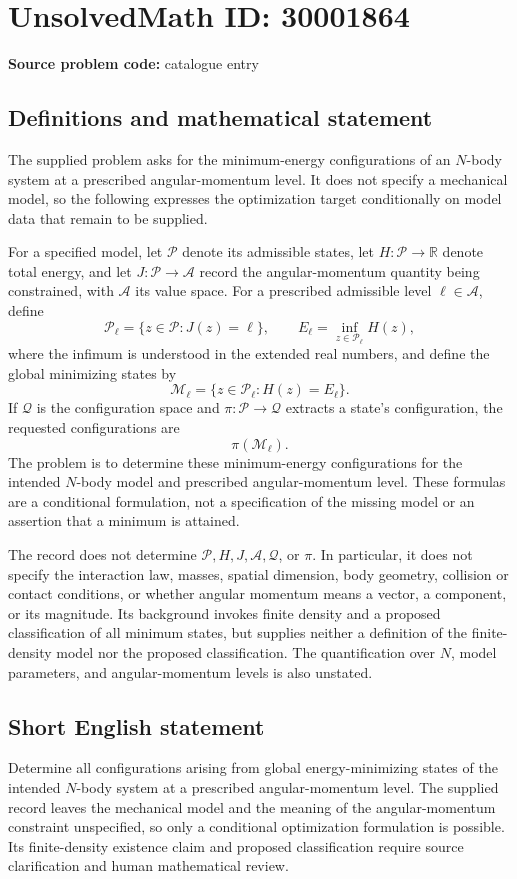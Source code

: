 \documentclass[11pt]{article}
\newcommand{\R}{\mathbb{R}}
\begin{document}
\section*{UnsolvedMath ID: 30001864}
\textbf{Source problem code:} catalogue entry
\subsection{Definitions and mathematical statement}
The supplied problem asks for the minimum-energy configurations of an \(N\)-body system at a prescribed angular-momentum level. It does not specify a mechanical model, so the following expresses the optimization target conditionally on model data that remain to be supplied.

For a specified model, let \(\mathcal P\) denote its admissible states, let \(H:\mathcal P\to\R\) denote total energy, and let \(J:\mathcal P\to\mathcal A\) record the angular-momentum quantity being constrained, with \(\mathcal A\) its value space. For a prescribed admissible level \(\ell\in\mathcal A\), define
\[
\mathcal P_\ell=\{z\in\mathcal P:J(z)=\ell\},\qquad
E_\ell=\inf_{z\in\mathcal P_\ell}H(z),
\]
where the infimum is understood in the extended real numbers, and define the global minimizing states by
\[
\mathcal M_\ell=\{z\in\mathcal P_\ell:H(z)=E_\ell\}.
\]
If \(\mathcal Q\) is the configuration space and \(\pi:\mathcal P\to\mathcal Q\) extracts a state's configuration, the requested configurations are
\[
\pi(\mathcal M_\ell).
\]
The problem is to determine these minimum-energy configurations for the intended \(N\)-body model and prescribed angular-momentum level. These formulas are a conditional formulation, not a specification of the missing model or an assertion that a minimum is attained.

The record does not determine \(\mathcal P,H,J,\mathcal A,\mathcal Q\), or \(\pi\). In particular, it does not specify the interaction law, masses, spatial dimension, body geometry, collision or contact conditions, or whether angular momentum means a vector, a component, or its magnitude. Its background invokes finite density and a proposed classification of all minimum states, but supplies neither a definition of the finite-density model nor the proposed classification. The quantification over \(N\), model parameters, and angular-momentum levels is also unstated.
\subsection{Short English statement}
Determine all configurations arising from global energy-minimizing states of the intended \(N\)-body system at a prescribed angular-momentum level. The supplied record leaves the mechanical model and the meaning of the angular-momentum constraint unspecified, so only a conditional optimization formulation is possible. Its finite-density existence claim and proposed classification require source clarification and human mathematical review.
\end{document}
